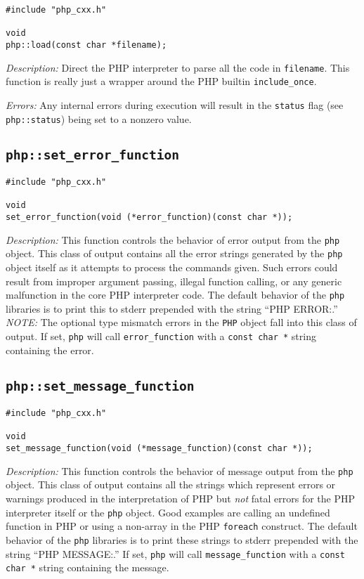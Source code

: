 \documentclass[11pt,titlepage]{article}
\begin{document}
\begin{verbatim}
#include "php_cxx.h"

void 
php::load(const char *filename);
\end{verbatim}

\emph{Description:} Direct the PHP interpreter to parse all the code in \verb|filename|. This function is really just a wrapper around the PHP builtin \verb|include_once|.

\emph{Errors:} Any internal errors during execution will result in the \verb|status| flag (see \verb|php::status|) being set to a nonzero value.


\subsection{\texttt{php::set\_error\_function}}

\begin{verbatim}
#include "php_cxx.h"

void 
set_error_function(void (*error_function)(const char *));
\end{verbatim}

\emph{Description:} This function controls the behavior of error output from the \verb|php| object. This class of output contains all the error strings generated by the \verb|php| object itself as it attempts to process the commands given. Such errors could result from improper argument passing, illegal function calling, or any generic malfunction in the core PHP interpreter code. The default behavior of the \verb|php| libraries is to print this to stderr prepended with the string ``PHP ERROR:.'' \emph{NOTE:} The optional type mismatch errors in the \verb|PHP| object fall into this class of output. If set, \verb|php| will call \verb|error_function| with a \verb|const char *| string containing the error.


\subsection{\texttt{php::set\_message\_function}}

\begin{verbatim}
#include "php_cxx.h"

void 
set_message_function(void (*message_function)(const char *));
\end{verbatim}

\emph{Description:} This function controls the behavior of message output from the \verb|php| object. This class of output contains all the strings which represent errors or warnings produced  in the interpretation of PHP but \emph{not} fatal errors for the PHP interpreter itself or the \verb|php| object. Good examples are calling an undefined function in PHP or using a non-array in the PHP \verb|foreach| construct. The default behavior of the \verb|php| libraries is to print these strings to stderr prepended with the string ``PHP MESSAGE:.'' If set, \verb|php| will call \verb|message_function| with a \verb|const char *| string containing the message.
\end{document}
